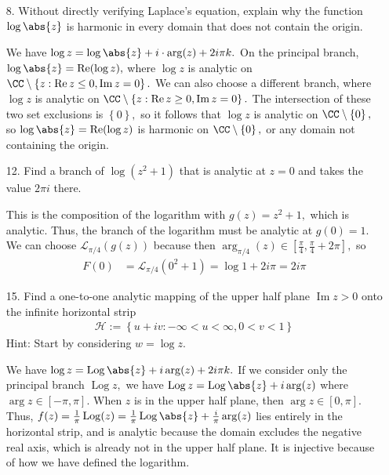\documentclass{article}
\DeclareMathOperator{\re}{Re}
\DeclareMathOperator{\im}{Im}
\DeclareMathOperator{\Log}{Log}
\begin{document}
\begin{itemize}
	\item[8.] Without directly verifying Laplace's equation, explain why the function $\log\abs{z}$ is harmonic in every domain that does not contain the origin.
		\begin{answer*}
			We have $\log z = \log\abs{z} + i\cdot\arg(z) + 2i\pi k.$ On the principal branch, $\log\abs{z}=\re(\log z),$ where $\log z$ is analytic on $\CC\setminus\left\{ z:\re z\le 0, \im z = 0 \right\}.$ We can also choose a different branch, where $\log z$ is analytic on $\CC\setminus\left\{ z:\re z \ge 0, \im z = 0 \right\}.$ The intersection of these two set exclusions is $\left\{ 0 \right\},$ so it follows that $\log z$ is analytic on $\CC\setminus\left\{ 0 \right\},$ so $\log\abs{z}=\re (\log z)$ is harmonic on $\CC\setminus\left\{ 0 \right\},$ or any domain not containing the origin.
		\end{answer*}

	\item[12.] Find a branch of $\log(z^2+1)$ that is analytic at $z=0$ and takes the value $2\pi i$ there.
		\begin{soln}
			This is the composition of the logarithm with $g(z)=z^2+1,$ which is analytic. Thus, the branch of the logarithm must be analytic at $g(0)=1.$ We can choose $\mathcal L_{\pi/4}(g(z))$ because then $\arg_{\pi/4}(z)\in\left[ \frac{\pi}{4}, \frac{\pi}{4}+2\pi \right],$ so
			\begin{align*}
				F(0) &= \mathcal L_{\pi/4}(0^2+1) = \log 1 + 2i\pi = 2i\pi
			\end{align*}
		\end{soln}
		
	\item[15.] Find a one-to-one analytic mapping of the upper half plane $\im z>0$ onto the infinite horizontal strip
		\begin{align*}
			\mathcal H:=\left\{ u+iv:-\infty<u<\infty, 0<v<1 \right\}
		\end{align*}
		Hint: Start by considering $w=\log z.$
		\begin{soln}
			We have $\log z = \Log\abs{z} + i\arg(z) + 2i\pi k.$ If we consider only the principal branch $\Log z,$ we have $\Log z = \Log \abs{z} + i\arg(z)$ where $\arg z\in[-\pi, \pi].$ When $z$ is in the upper half plane, then $\arg z\in[0, \pi].$ Thus, $f(z) = \frac{1}{\pi} \Log(z) = \frac{1}{\pi}\Log\abs{z} + \frac{i}{\pi}\arg(z)$ lies entirely in the horizontal strip, and is analytic because the domain excludes the negative real axis, which is already not in the upper half plane. It is injective because of how we have defined the logarithm.
		\end{soln}


\end{itemize}
\end{document}
